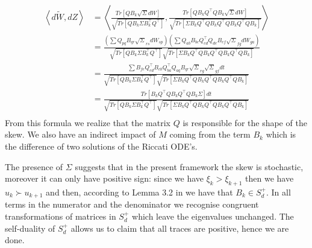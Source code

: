 \begin{align}
\left\langle d\tilde{W},dZ\right\rangle&=\left\langle \frac{Tr\left[QB_k\sqrt{\Sigma}dW\right]}{\sqrt{Tr\left[QB_k\Sigma B_k^{\top}Q^{\top}\right]}},\frac{Tr\left[QB_kQ^{\top}QB_k\sqrt{\Sigma}dW\right]}{\sqrt{Tr\left[\Sigma B_kQ^{\top}QB_kQ^{\top}QB_kQ^{\top}QB_k \right]}} \right\rangle\nonumber\\
&=\frac{\left(\sum{Q_{pq}B_{qr}\sqrt{\Sigma}_{rs}dW_{sp}}\right)\left(\sum{Q_{ab}B_{bc}Q^{\top}_{cd}Q_{de}B_{ef}\sqrt{\Sigma}_{fg}dW_{ga}}\right)}{\sqrt{Tr\left[QB_k\Sigma B_k^{\top}Q^{\top}\right]}\sqrt{Tr\left[\Sigma B_kQ^{\top}QB_kQ^{\top}QB_kQ^{\top}QB_k \right]}}\nonumber\\
&=\frac{\sum{B_{fe}Q^{\top}_{ed}B_{cb}Q^{\top}_{ba}Q_{aq}B_{qr}\sqrt{\Sigma}_{rg}\sqrt{\Sigma}_{gf}}dt}{\sqrt{Tr\left[QB_k\Sigma B_k^{\top}Q^{\top}\right]}\sqrt{Tr\left[\Sigma B_kQ^{\top}QB_kQ^{\top}QB_kQ^{\top}QB_k \right]}}\nonumber\\
&=\frac{Tr\left[B_kQ^{\top}QB_kQ^{\top}QB_k\Sigma\right]dt}{\sqrt{Tr\left[QB_k\Sigma B_k^{\top}Q^{\top}\right]}\sqrt{Tr\left[\Sigma B_kQ^{\top}QB_kQ^{\top}QB_kQ^{\top}QB_k \right]}}\nonumber\\
\end{align}
From this formula we realize that the matrix $Q$ is responsible for the shape of the skew. We also have an indirect impact of $M$ coming from the term $B_k$ which is the difference of two solutions of the Riccati ODE's. 

The presence of $\Sigma$ suggests that in the present framework the skew is stochastic, moreover it can only have positive sign: since we have $\xi_k>\xi_{k+1}$ then we have $u_k\succ u_{k+1}$ and then, according to Lemma 3.2 in \cite{article_Cuchiero} we have that $B_k\in S_d^+$. In all terms in the numerator and the denominator we recognise congruent transformations of matrices in $S_d^+$ which leave the eigenvalues unchanged. The self-duality of $S_d^+$ allows us to claim that all traces are positive, hence we are done.

